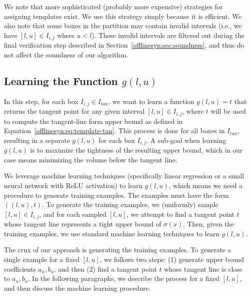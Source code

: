We note that more sophisticated (probably more expensive) strategies for
assigning templates exist. We use this strategy simply because it is efficient.
We also note that some boxes in the partition may contain invalid intervals
(i.e., we have $ [l, u] \in I_{i,j} $ where $ u < l $). These invalid intervals
are filtered out during the final verification step  described in
Section~\ref{offlinesyn:sec:soundness}, and thus do not affect the soundness of our
algorithm.

\subsection{Learning the Function $ g(l, u) $}\label{offlinesyn:sec:learning}

In this step, for each box $ I_{i,j} \in I_{tan} $, we want to learn a
function $ g(l, u) = t $ that returns the tangent point for any given
interval $[l,u] \in I_{i,j}$, where $ t $ will be used to compute the
tangent-line form upper bound as defined in
Equation~\ref{offlinesyn:eq:template-tan}.
%
This process is done for all boxes in $ I_{tan} $,
resulting in a separate $ g(l, u) $ for each box $ I_{i,j} $.
%
A sub-goal when learning $
g(l, u) $ is to maximize the tightness of the resulting upper bound, which in
our case means minimizing the volume below the tangent line.

We leverage machine learning techniques (specifically linear regression
or a small neural network with ReLU activation) to learn $ g(l, u) $, which means we need a
procedure to generate training examples. The examples must have the form $ ((l,
u), t) $. To generate the training examples, we
(uniformly) sample $ [l, u] \in I_{i,j} $, and for each sampled $ [l, u] $, we
attempt to find a tangent point $ t $ whose tangent line represents a tight
upper bound of
$\sigma(x)$. Then, given the training examples, we use standard machine
learning techniques to learn $ g(l, u) $.

The crux of our approach is generating the training examples. To generate a
single example for a fixed $ [l, u] $, we follows two steps: (1) generate
upper bound coefficients $ a_u, b_u $, and then (2) find a tangent point
$ t $ whose tangent line is close to $ a_u, b_u $. In the following paragraphs, we
describe the process for a fixed $ [l, u] $, and then discuss the machine
learning procedure.


